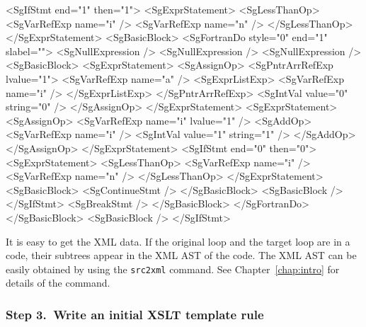\begin{framed}
\begin{src}
<SgIfStmt end="1" then="1">
  <SgExprStatement>
    <SgLessThanOp>
      <SgVarRefExp name="i" />
      <SgVarRefExp name="n" />
    </SgLessThanOp>
  </SgExprStatement>
  <SgBasicBlock>
    <SgFortranDo style="0" end="1" slabel="">
      <SgNullExpression />
      <SgNullExpression />
      <SgNullExpression />
      <SgBasicBlock>
	<SgExprStatement>
          <SgAssignOp>
            <SgPntrArrRefExp lvalue="1">
              <SgVarRefExp name="a" />
              <SgExprListExp>
		<SgVarRefExp name="i" />
              </SgExprListExp>
            </SgPntrArrRefExp>
            <SgIntVal value="0" string="0" />
          </SgAssignOp>
	</SgExprStatement>
	<SgExprStatement>
          <SgAssignOp>
            <SgVarRefExp name="i" lvalue="1" />
            <SgAddOp>
              <SgVarRefExp name="i" />
              <SgIntVal value="1" string="1" />
            </SgAddOp>
          </SgAssignOp>
	</SgExprStatement>
	<SgIfStmt end="0" then="0">
          <SgExprStatement>
            <SgLessThanOp>
              <SgVarRefExp name="i" />
              <SgVarRefExp name="n" />
            </SgLessThanOp>
          </SgExprStatement>
          <SgBasicBlock>
            <SgContinueStmt />
          </SgBasicBlock>
          <SgBasicBlock />
	</SgIfStmt>
	<SgBreakStmt />
      </SgBasicBlock>
    </SgFortranDo>
  </SgBasicBlock>
  <SgBasicBlock />
</SgIfStmt>
\end{src}
\end{framed}

It is easy to get the XML data. If the original loop and the target loop
are in a code, their subtrees appear in the XML AST of the code.  The
XML AST can be easily obtained by using the \texttt{src2xml} command.
See Chapter~\ref{chap:intro} for details of the command.


\subsubsection*{Step 3.~Write an initial XSLT template rule}

